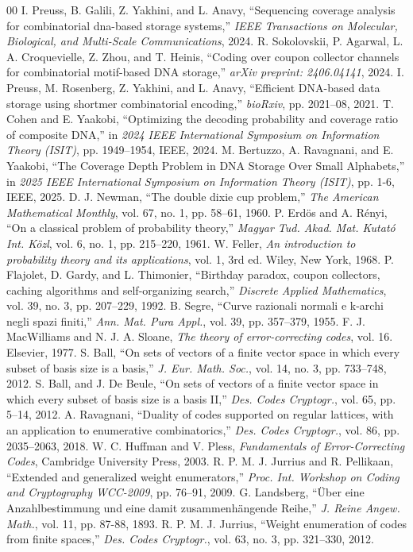 \documentclass[11pt,a4paper,reqno,twoside]{article}
\theoremstyle{definition}
\begin{document}
\begin{thebibliography}{00}
 I. Preuss, B. Galili, Z. Yakhini, and L. Anavy, ``Sequencing coverage analysis for combinatorial dna-based storage systems,'' \emph{IEEE Transactions on Molecular, Biological, and Multi-Scale Communications}, 2024.
 R. Sokolovskii, P. Agarwal, L. A. Croquevielle, Z. Zhou, and T. Heinis, ``Coding over coupon collector channels for combinatorial motif-based DNA storage,'' \emph{arXiv preprint: 2406.04141}, 2024.
 I. Preuss, M. Rosenberg, Z. Yakhini, and L. Anavy, ``Efficient DNA-based data storage using shortmer combinatorial encoding,'' \emph{bioRxiv}, pp. 2021–08, 2021.
 T. Cohen and E. Yaakobi, ``Optimizing the decoding probability and coverage ratio of composite DNA,'' in \emph{2024 IEEE International Symposium on Information Theory (ISIT)}, pp. 1949–1954, IEEE, 2024.
 M. Bertuzzo, A. Ravagnani, and E. Yaakobi, ``The Coverage Depth Problem in DNA Storage Over Small Alphabets,'' in \emph{2025 IEEE International Symposium on Information Theory (ISIT)}, pp. 1-6, IEEE, 2025.
 D. J. Newman, ``The double dixie cup problem,'' \emph{The American Mathematical Monthly}, vol. 67, no. 1, pp. 58–61, 1960.
 P. Erd\"{o}s and A. Rényi, ``On a classical problem of probability theory,'' \emph{Magyar Tud. Akad. Mat. Kutató Int. Közl}, vol. 6, no. 1, pp. 215–220, 1961.
 W. Feller, \emph{An introduction to probability theory and its applications}, vol. 1, 3rd ed. Wiley, New York, 1968.
 P. Flajolet, D. Gardy, and L. Thimonier, ``Birthday paradox, coupon collectors, caching algorithms and self-organizing search,'' \emph{Discrete Applied Mathematics}, vol. 39, no. 3, pp. 207–229, 1992.
 B. Segre, ``Curve razionali normali e k-archi negli spazi finiti,'' \emph{Ann. Mat. Pura Appl.}, vol. 39, pp. 357–379, 1955.
 F. J. MacWilliams and N. J. A. Sloane, \emph{The theory of error-correcting codes}, vol. 16. Elsevier, 1977.
 S. Ball, ``On sets of vectors of a finite vector space in which every subset of basis size is a basis,'' \emph{J. Eur. Math. Soc.}, vol. 14, no. 3, pp. 733–748, 2012.
 S. Ball, and J. De Beule, ``On sets of vectors of a finite vector space in which every subset of basis size is a basis II,'' \emph{Des. Codes Cryptogr.}, vol. 65, pp. 5–14, 2012.
 A. Ravagnani, ``Duality of codes supported on regular lattices, with an application to enumerative combinatorics,'' \emph{Des. Codes Cryptogr.}, vol. 86, pp. 2035–2063, 2018.
 W. C. Huffman and V. Pless, \emph{Fundamentals of Error-Correcting Codes}, Cambridge University Press, 2003.
 R. P. M. J. Jurrius and R. Pellikaan, ``Extended and generalized weight enumerators,'' \emph{Proc. Int. Workshop on Coding and Cryptography WCC-2009}, pp. 76–91, 2009.
 G. Landsberg, ``\"Uber eine Anzahlbestimmung und eine damit zusammenhängende Reihe,'' \emph{J. Reine Angew. Math.}, vol. 11, pp. 87-88, 1893.
 R. P. M. J. Jurrius, ``Weight enumeration of codes from finite spaces,'' \emph{Des. Codes Cryptogr.}, vol. 63, no. 3, pp. 321–330, 2012.
\end{thebibliography}
\end{document}
